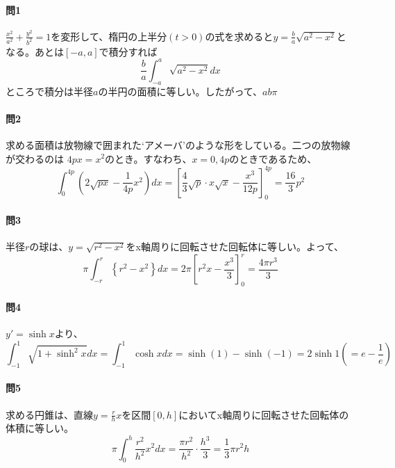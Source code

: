 \documentclass[a4j,dvipdfmx]{jsarticle}
\begin{document}
                    \paragraph{問1}$\displaystyle\frac{x^2}{a^2}+\frac{y^2}{b^2}=1$を変形して、楕円の上半分$(t>0)$の式を求めると$\displaystyle y = \frac{b}{a}\sqrt{a^2-x^2}$となる。あとは$[-a,a]$で積分すれば
                    \begin{equation*}
                        \frac{b}{a}\int_{-a}^{a}\sqrt{a^2-x^2}dx
                    \end{equation*}
                    ところで積分は半径$a$の半円の面積に等しい。したがって、$ab\pi$

                    \paragraph{問2}求める面積は放物線で囲まれた`アメーバ'のような形をしている。二つの放物線が交わるのは
                    $4px = x^2$のとき。すなわち、$x=0,4p$のときであるため、
                    \begin{equation*}
                        \int_{0}^{4p}\left(2\sqrt{px}-\frac{1}{4p}x^2\right)dx = \left[\frac{4}{3}\sqrt{p}\cdot x\sqrt{x}-\frac{x^3}{12p}\right]_0^{4p}=\frac{16}{3}p^2
                    \end{equation*}

                    \paragraph{問3}半径$r$の球は、$y=\sqrt{r^2-x^2}$をx軸周りに回転させた回転体に等しい。よって、
                    \begin{equation*}
                        \pi\int_{-r}^{r}\left\{r^2-x^2\right\}dx = 2\pi\left[r^2x-\frac{x^3}{3}\right]_0^r = \frac{4\pi r^3}{3}
                    \end{equation*}

                    \paragraph{問4}$y'=\sinh x$より、
                    \begin{equation*}
                        \int_{-1}^{1}\sqrt{1+\sinh^2 x}dx =\int_{-1}^{1}\cosh xdx = \sinh(1)-\sinh(-1)=2\sinh 1 \left(=e-\frac{1}{e}\right)
                    \end{equation*}

                    \paragraph{問5}求める円錐は、直線$y=\frac{r}{h}x$を区間$[0,h]$においてx軸周りに回転させた回転体の体積に等しい。
                    \begin{equation*}
                        \pi\int_{0}^{h}\frac{r^2}{h^2}x^2dx = \frac{\pi r^2}{h^2}\cdot \frac{h^3}{3}=\frac{1}{3}\pi r^2h
                    \end{equation*}
\end{document}
